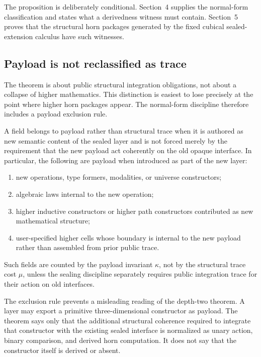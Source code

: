 \documentclass{lmcs}
\begin{document}
The proposition is deliberately conditional.  Section~4 supplies the normal-form
classification and states what a derivedness witness must contain.  Section~5 proves that the
structural horn packages generated by the fixed cubical sealed-extension calculus have such
witnesses.

\subsection{Payload is not reclassified as trace}

The theorem is about public structural integration obligations, not about a collapse of
higher mathematics.  This distinction is easiest to lose precisely at the point where higher
horn packages appear.  The normal-form discipline therefore includes a payload exclusion
rule.

\begin{defi}
A field belongs to payload rather than structural trace when it is authored as new semantic
content of the sealed layer and is not forced merely by the requirement that the new payload
act coherently on the old opaque interface.  In particular, the following are payload when
introduced as part of the new layer:
\begin{enumerate}
\item new operations, type formers, modalities, or universe constructors;
\item algebraic laws internal to the new operation;
\item higher inductive constructors or higher path constructors contributed as new
mathematical structure;
\item user-specified higher cells whose boundary is internal to the new payload rather than
assembled from prior public trace.
\end{enumerate}
Such fields are counted by the payload invariant \(\kappa\), not by the structural trace cost
\(\mu\), unless the sealing discipline separately requires public integration trace for their
action on old interfaces.
\end{defi}

The exclusion rule prevents a misleading reading of the depth-two theorem.  A layer may
export a primitive three-dimensional constructor as payload.  The theorem says only that the
additional structural coherence required to integrate that constructor with the existing
sealed interface is normalized as unary action, binary comparison, and derived horn
computation.  It does not say that the constructor itself is derived or absent.
\end{document}
